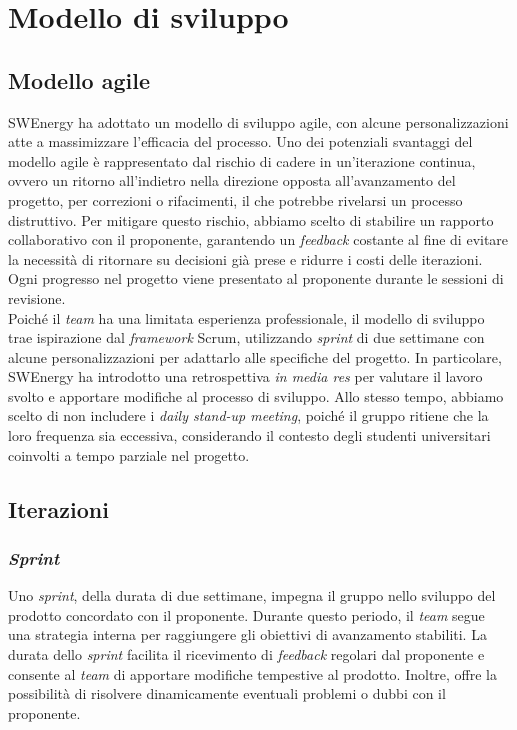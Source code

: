 \section{Modello di sviluppo}

\subsection{Modello agile}
SWEnergy ha adottato un modello di sviluppo agile, con alcune personalizzazioni atte 
a massimizzare l'efficacia del processo. 
Uno dei potenziali svantaggi del modello agile è rappresentato dal rischio di cadere 
in un'iterazione continua, ovvero un ritorno all'indietro nella direzione opposta all'avanzamento del progetto, per correzioni o
rifacimenti, il che potrebbe rivelarsi un processo distruttivo. 
Per mitigare questo rischio, abbiamo scelto di stabilire un rapporto collaborativo 
con il proponente, garantendo un \textit{feedback} costante al fine di evitare la 
necessità di ritornare su decisioni già prese e ridurre i costi delle iterazioni. 
Ogni progresso nel progetto viene presentato al proponente durante le sessioni di revisione. \\

Poiché il \textit{team} ha una limitata esperienza professionale, il modello di sviluppo 
trae ispirazione dal \textit{framework} Scrum, utilizzando \textit{sprint} di due settimane 
con alcune personalizzazioni per adattarlo alle specifiche del progetto. 
In particolare, SWEnergy ha introdotto una retrospettiva \textit{in media res} per valutare 
il lavoro svolto e apportare modifiche al processo di sviluppo. 
Allo stesso tempo, abbiamo scelto di non includere i \textit{daily stand-up meeting}, poiché 
il gruppo ritiene che la loro frequenza sia eccessiva, considerando il contesto degli 
studenti universitari coinvolti a tempo parziale nel progetto.

\subsection{Iterazioni}

\subsubsection{\textit{Sprint}}
Uno \textit{sprint}, della durata di due settimane, impegna il gruppo nello 
sviluppo del prodotto concordato con il proponente. 
Durante questo periodo, il \textit{team} segue una strategia interna per raggiungere 
gli obiettivi di avanzamento stabiliti. 
La durata dello \textit{sprint} facilita il ricevimento di \textit{feedback} 
regolari dal proponente e consente al \textit{team} di apportare modifiche tempestive 
al prodotto. 
Inoltre, offre la possibilità di risolvere dinamicamente eventuali problemi 
o dubbi con il proponente.

